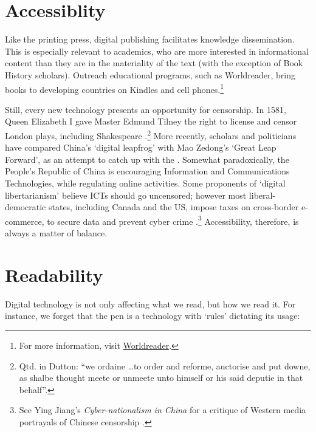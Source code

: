 \documentclass[12pt,a4paper]{scrartcl}
\begin{document}
 \section{Accessiblity}

Like the printing press, digital publishing facilitates knowledge dissemination. This is especially relevant to academics, who are more interested in informational content than they are in the materiality of the text (with the exception of Book History scholars). Outreach educational programs, such as Worldreader, bring books to developing countries on Kindles and cell phones.\footnote{For more information, visit
\href{http://www.worldreader.org/}{Worldreader}.} 

Still, every new technology presents an opportunity for censorship. In 1581, Queen Elizabeth I gave Master Edmund Tilney the right to license and censor London plays, including Shakespeare \cite[2]{dutton}.\footnote{Qtd. in Dutton: \enquote{we ordaine \ldots to order and reforme, auctorise and put downe, as shalbe thought meete or unmeete unto himself or his said deputie in that behalf}\autocite[2]{dutton}.} More recently, scholars and politicians have compared China's `digital leapfrog'  with Mao Zedong's `Great Leap Forward', as an attempt to catch up with the \autocite[2]{hughes}. Somewhat paradoxically, the People's Republic of China is encouraging Information and Communications Technologies, while regulating online activities. Some proponents of `digital libertarianism' believe ICTs should go uncensored; however most liberal-democratic states, including Canada and the US, impose taxes on cross-border e-commerce, to secure data and prevent cyber crime \cite[59]{hughes}.\footnote{See Ying Jiang's \textit{Cyber-nationalism in China} for a critique of Western media portrayals of Chinese censorship \autocite{jiang}.} Accessibility, therefore, is always a matter of balance.

\section{Readability}

Digital technology is not only affecting what we read, but how we read it. For instance, we forget that the pen is a technology with `rules' dictating its usage:
\end{document}
